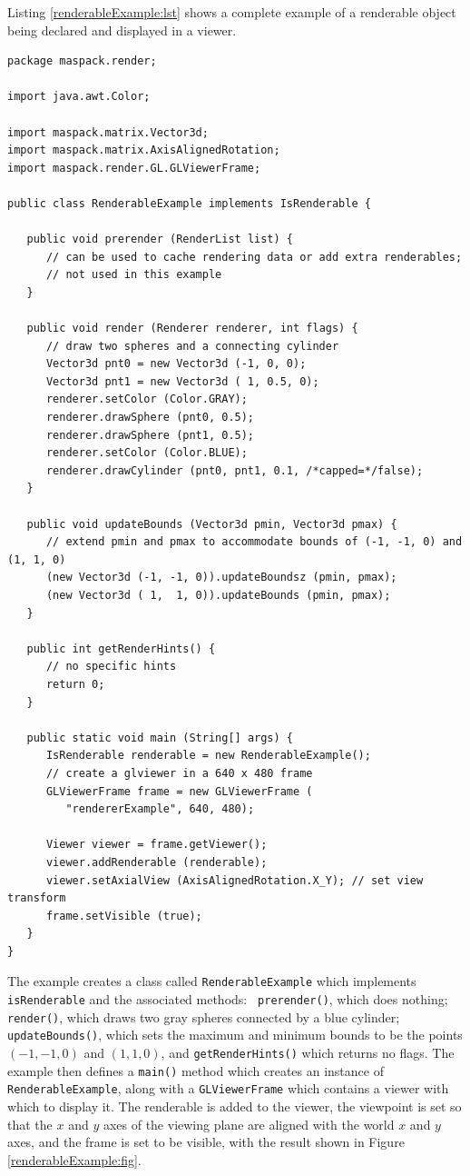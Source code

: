 Listing \ref{renderableExample:lst} shows a complete example
of a renderable object being declared and displayed in a viewer.
%
\begin{lstlisting}[caption={Declaration and display of a renderable
object.},
label=renderableExample:lst]
package maspack.render;

import java.awt.Color;

import maspack.matrix.Vector3d;
import maspack.matrix.AxisAlignedRotation;
import maspack.render.GL.GLViewerFrame;

public class RenderableExample implements IsRenderable {

   public void prerender (RenderList list) {
      // can be used to cache rendering data or add extra renderables;
      // not used in this example
   }

   public void render (Renderer renderer, int flags) {
      // draw two spheres and a connecting cylinder
      Vector3d pnt0 = new Vector3d (-1, 0, 0);
      Vector3d pnt1 = new Vector3d ( 1, 0.5, 0);
      renderer.setColor (Color.GRAY);
      renderer.drawSphere (pnt0, 0.5);
      renderer.drawSphere (pnt1, 0.5);
      renderer.setColor (Color.BLUE);
      renderer.drawCylinder (pnt0, pnt1, 0.1, /*capped=*/false);
   }

   public void updateBounds (Vector3d pmin, Vector3d pmax) {
      // extend pmin and pmax to accommodate bounds of (-1, -1, 0) and (1, 1, 0)
      (new Vector3d (-1, -1, 0)).updateBoundsz (pmin, pmax);
      (new Vector3d ( 1,  1, 0)).updateBounds (pmin, pmax);
   }

   public int getRenderHints() {
      // no specific hints
      return 0; 
   }

   public static void main (String[] args) {
      IsRenderable renderable = new RenderableExample();
      // create a glviewer in a 640 x 480 frame      
      GLViewerFrame frame = new GLViewerFrame (
         "rendererExample", 640, 480);

      Viewer viewer = frame.getViewer();
      viewer.addRenderable (renderable);
      viewer.setAxialView (AxisAlignedRotation.X_Y); // set view transform
      frame.setVisible (true);
   }
}
\end{lstlisting}
The example creates a class called {\tt RenderableExample} which
implements {\tt isRenderable} and the associated methods: {\tt
prerender()}, which does nothing; {\tt render()}, which draws two gray
spheres connected by a blue cylinder; {\tt updateBounds()}, which sets
the maximum and minimum bounds to be the points $(-1, -1, 0)$ and $(1,
1, 0)$, and {\tt getRenderHints()} which returns no flags. The example
then defines a {\tt main()} method which creates an instance of {\tt
RenderableExample}, along with a {\tt GLViewerFrame} which contains a
viewer with which to display it. The renderable is added to the
viewer, the viewpoint is set so that the $x$ and $y$ axes of the
viewing plane are aligned with the world $x$ and $y$ axes, and the
frame is set to be visible, with the result shown in Figure
\ref{renderableExample:fig}.

